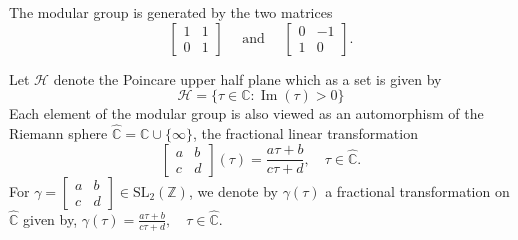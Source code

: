 \begin{proposition}
The modular group is generated by the two matrices
$$
\left[\begin{array}{ll}
1 & 1 \\
0 & 1
\end{array}\right] \quad \text { and } \quad\left[\begin{array}{rr}
0 & -1 \\
1 & 0
\end{array}\right].
$$

\end{proposition}
Let $\mathcal{H}$ denote the Poincare upper half plane which as a set is given by
$$
\mathcal{H}=\{\tau \in \mathbb{C}: \operatorname{Im}(\tau)>0\}
$$
Each element of the modular group is also viewed as an automorphism of the Riemann sphere $\widehat{\mathbb{C}}=\mathbb{C} \cup\{\infty\}$, the fractional linear transformation
$$
\left[\begin{array}{ll}
a & b \\
c & d
\end{array}\right](\tau)=\frac{a \tau+b}{c \tau+d}, \quad \tau \in \widehat{\mathbb{C}}.
$$ For $\gamma= \left[\begin{array}{ll}
a & b \\
c & d
\end{array}\right]  \in \mathrm{SL}_{2}(\mathbb{Z}) $, we denote by $\gamma(\tau)$ a fractional transformation on $\widehat{\mathbb{C}}$ given by, $\gamma(\tau)=\frac{a \tau+b}{c \tau+d}, \quad \tau \in \widehat{\mathbb{C}}.$ 
